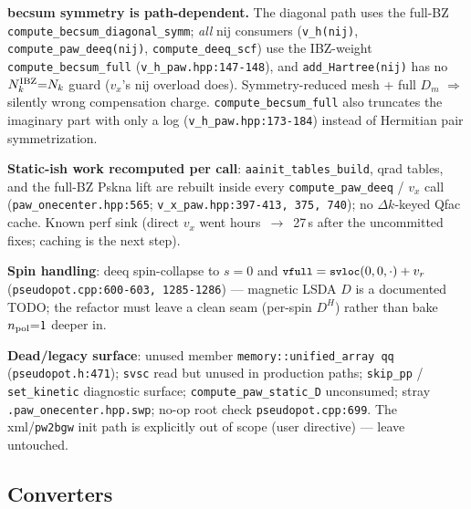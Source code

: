 \documentclass[11pt]{article}
\newcommand{\code}[1]{\texttt{\small #1}}
\newcommand{\file}[1]{\texttt{\small #1}}
\begin{document}
\begin{description}[leftmargin=2.6em,style=nextline]
\item[F4.] \textbf{becsum symmetry is path-dependent.} The diagonal path uses
the full-BZ \code{compute\_becsum\_diagonal\_symm}; \emph{all} nij consumers
(\code{v\_h(nij)}, \code{compute\_paw\_deeq(nij)}, \code{compute\_deeq\_scf})
use the IBZ-weight \code{compute\_becsum\_full}
(\file{v\_h\_paw.hpp:147-148}), and \code{add\_Hartree(nij)} has no
$N_k^{\rm IBZ}{=}N_k$ guard ($v_x$'s nij overload does). Symmetry-reduced
mesh + full $D_m$ $\Rightarrow$ silently wrong compensation charge.
\code{compute\_becsum\_full} also truncates the imaginary part with only a
log (\file{v\_h\_paw.hpp:173-184}) instead of Hermitian pair symmetrization.

\item[F5.] \textbf{Static-ish work recomputed per call}:
\code{aainit\_tables\_build}, qrad tables, and the full-BZ Pskna lift are
rebuilt inside every \code{compute\_paw\_deeq} / $v_x$ call
(\file{paw\_onecenter.hpp:565}; \file{v\_x\_paw.hpp:397-413, 375, 740}); no
$\Delta k$-keyed Qfac cache. Known perf sink (direct $v_x$ went
hours~$\to$~27\,s after the uncommitted fixes; caching is the next step).

\item[F6.] \textbf{Spin handling}: deeq spin-collapse to $s{=}0$ and
$\code{vfull} = \code{svloc}(0,0,\cdot)+v_r$
(\code{pseudopot.cpp:600-603, 1285-1286}) --- magnetic LSDA $D$ is a
documented TODO; the refactor must leave a clean seam (per-spin $D^H$)
rather than bake $n_{\rm pol}{=}1$ deeper in.

\item[F7.] \textbf{Dead/legacy surface}: unused member
\code{memory::unified\_array qq} (\file{pseudopot.h:471}); \code{svsc} read
but unused in production paths; \code{skip\_pp} / \code{set\_kinetic}
diagnostic surface; \code{compute\_paw\_static\_D} unconsumed; stray
\file{.paw\_onecenter.hpp.swp}; no-op root check \code{pseudopot.cpp:699}.
The xml/\code{pw2bgw} init path is explicitly out of scope (user directive)
--- leave untouched.
\end{description}

\subsection{Converters}
\end{document}
